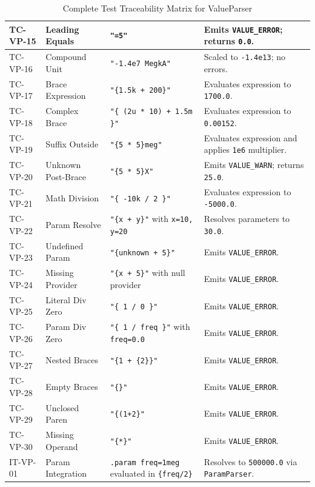 \begin{table}[H]
\begin{tabular}{|l|l|p{4.5cm}|p{4.5cm}|}
\hline
TC-VP-15 & Leading Equals & \texttt{"=5"} & Emits \texttt{VALUE\_ERROR}; returns \texttt{0.0}. \\
\hline
TC-VP-16 & Compound Unit & \texttt{"-1.4e7 MegkA"} & Scaled to \texttt{-1.4e13}; no errors. \\
\hline
TC-VP-17 & Brace Expression & \texttt{"\{1.5k + 200\}"} & Evaluates expression to \texttt{1700.0}. \\
\hline
TC-VP-18 & Complex Brace & \texttt{"\{ (2u * 10) + 1.5m \}"} & Evaluates expression to \texttt{0.00152}. \\
\hline
TC-VP-19 & Suffix Outside & \texttt{"\{5 * 5\}meg"} & Evaluates expression and applies \texttt{1e6} multiplier. \\
\hline
TC-VP-20 & Unknown Post-Brace & \texttt{"\{5 * 5\}X"} & Emits \texttt{VALUE\_WARN}; returns \texttt{25.0}. \\
\hline
TC-VP-21 & Math Division & \texttt{"\{ -10k / 2 \}"} & Evaluates expression to \texttt{-5000.0}. \\
\hline
TC-VP-22 & Param Resolve & \texttt{"\{x + y\}"} with \texttt{x=10, y=20} & Resolves parameters to \texttt{30.0}. \\
\hline
TC-VP-23 & Undefined Param & \texttt{"\{unknown + 5\}"} & Emits \texttt{VALUE\_ERROR}. \\
\hline
TC-VP-24 & Missing Provider & \texttt{"\{x + 5\}"} with null provider & Emits \texttt{VALUE\_ERROR}. \\
\hline
TC-VP-25 & Literal Div Zero & \texttt{"\{ 1 / 0 \}"} & Emits \texttt{VALUE\_ERROR}. \\
\hline
TC-VP-26 & Param Div Zero & \texttt{"\{ 1 / freq \}"} with \texttt{freq=0.0} & Emits \texttt{VALUE\_ERROR}. \\
\hline
TC-VP-27 & Nested Braces & \texttt{"\{1 + \{2\}\}"} & Emits \texttt{VALUE\_ERROR}. \\
\hline
TC-VP-28 & Empty Braces & \texttt{"\{\}"} & Emits \texttt{VALUE\_ERROR}. \\
\hline
TC-VP-29 & Unclosed Paren & \texttt{"\{(1+2\}"} & Emits \texttt{VALUE\_ERROR}. \\
\hline
TC-VP-30 & Missing Operand & \texttt{"\{*\}"} & Emits \texttt{VALUE\_ERROR}. \\
\hline
IT-VP-01 & Param Integration & \texttt{.param freq=1meg} evaluated in \texttt{\{freq/2\}} & Resolves to \texttt{500000.0} via \texttt{ParamParser}. \\
\hline
\end{tabular}
\caption{Complete Test Traceability Matrix for ValueParser}
\end{table}


